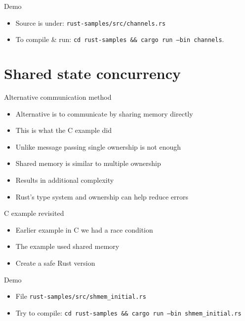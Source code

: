 \documentclass{beamer}
\begin{document}
\begin{frame}{Demo}
     \begin{itemize}
        \item Source is under: \texttt{rust-samples/src/channels.rs}
        \item To compile \& run: \texttt{cd rust-samples \&\& cargo run --bin channels}.
    \end{itemize}
\end{frame}

\section{Shared state concurrency}

\begin{frame}{Alternative communication method}
    \begin{itemize}
        \item Alternative is to communicate by sharing memory directly
        \item This is what the C example did
        \item Unlike message passing single ownership is not enough
        \item Shared memory is similar to multiple ownership
        \item Results in additional complexity
        \item Rust's type system and ownership can help reduce errors
    \end{itemize}
\end{frame}

\begin{frame}{C example revisited}
    \begin{itemize}
        \item Earlier example in C we had a race condition
        \item The example used shared memory
        \item Create a safe Rust version
    \end{itemize}
\end{frame}

\begin{frame}{Demo}
    \begin{itemize}
    \item File \texttt{rust-samples/src/shmem\_initial.rs}
    \item Try to compile: \texttt{cd rust-samples \&\& cargo run --bin shmem\_initial.rs}
    \end{itemize}
\end{frame}
\end{document}
